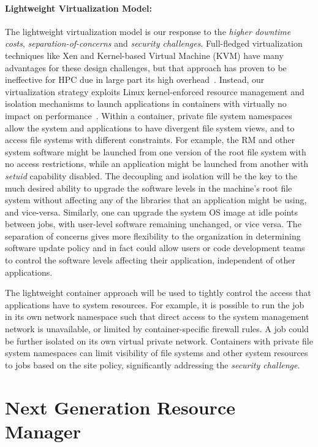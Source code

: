 \documentclass[10pt]{article}
\begin{document}
\paragraph{Lightweight Virtualization Model:}
The lightweight virtualization model is our response to 
the {\sl higher downtime costs}, {\sl separation-of-concerns} and
{\sl security challenges}. Full-fledged virtualization techniques like Xen and
Kernel-based Virtual Machine (KVM) have many advantages for these design challenges, but
that approach has proven to be ineffective for HPC due in large part
its high overhead~\cite{VirtHPC}.
Instead, our virtualization strategy exploits Linux kernel-enforced
resource management and isolation mechanisms to launch applications in
containers with virtually no impact on performance~\cite{ContainerVirt}.
Within a container, private file system namespaces allow the system and
applications to have divergent file system views, and to access file
systems with different constraints. 
For example, the RM and other system software might be launched from
one version of the root file system with no access restrictions,
while an application might be launched from another with {\em setuid}
capability disabled.
The decoupling and isolation will be
the key to the much desired ability to upgrade the software levels in the
machine's root file system without affecting any of the libraries that
an application might be using, and vice-versa. Similarly, one can upgrade
the system OS image at idle points between jobs, with user-level software
remaining unchanged, or vice versa. The separation of concerns gives more
flexibility to the organization in determining software update policy
and in fact could allow users or code development teams to control the
software levels affecting their application, independent of other
applications.


The lightweight container approach will be used to tightly control the access
that applications have to system resources. For example, it is possible to
run the job in its own network namespace such that direct access to the
system management network is unavailable, or limited by container-specific
firewall rules.  A job could be further isolated on its own virtual private
network.
Containers with private file system namespaces can limit visibility of
file systems and other system resources to jobs based on the site policy,
significantly addressing the {\sl security challenge}.

\section{Next Generation Resource Manager}
\label{sect:ngrm}
\end{document}
